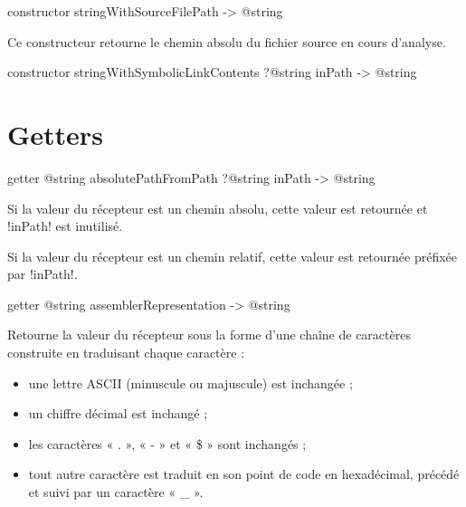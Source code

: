 
\begin{galgas3box}
constructor stringWithSourceFilePath -> @string
\end{galgas3box}

Ce constructeur retourne le chemin absolu du fichier source en cours d'analyse.







\begin{galgas3box}
constructor stringWithSymbolicLinkContents ?@string inPath -> @string
\end{galgas3box}



















\section{Getters}



\begin{galgas3box}
getter @string absolutePathFromPath ?@string inPath -> @string
\end{galgas3box}

Si la valeur du récepteur est un chemin absolu, cette valeur est retournée et \ggst!inPath! est inutilisé.

Si la valeur du récepteur est un chemin relatif, cette valeur est retournée préfixée par \ggst!inPath!.





\begin{galgas3box}
getter @string assemblerRepresentation -> @string
\end{galgas3box}

Retourne la valeur du récepteur sous la forme d'une chaîne de caractères construite en traduisant chaque caractère :
\begin{itemize}
\item une lettre ASCII (minuscule ou majuscule) est inchangée ;
\item un chiffre décimal est inchangé ;
\item les caractères « . »,  « - » et  « \$ » sont inchangés ;
\item tout autre caractère est traduit en son point de code en hexadécimal, précédé et suivi par un caractère « \_ ».
\end{itemize}

